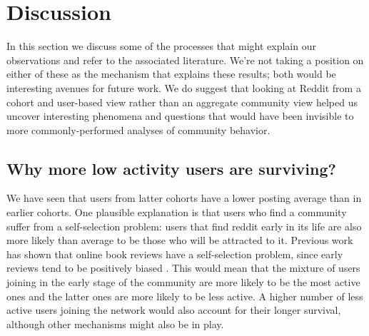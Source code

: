 \section{Discussion}

In this section we discuss some of the processes that might explain our observations and refer to the associated literature. We're not taking a position on either of these as the mechanism that explains these results; both would be interesting avenues for future work.  We do suggest that looking at Reddit from a cohort and user-based view rather than an aggregate community view helped us uncover interesting phenomena and questions that would have been invisible to more commonly-performed analyses of community behavior. 

\subsection{Why more low activity users are surviving?}

We have seen that users from latter cohorts have a lower posting average than in earlier cohorts. 
One plausible explanation is that users who find a community suffer from a self-selection problem: users that find reddit early in its life are also more likely than average to be those who will be attracted to it. Previous work has shown that online book reviews have a self-selection problem, since early reviews tend to be positively biased \cite{Li2008}. This would mean that the mixture of users joining in the early stage of the community are more likely to be the most active ones and the latter ones are more likely to be less active. A higher number of less active users joining the network would also account for their longer survival, although other mechanisms might also be in play.


